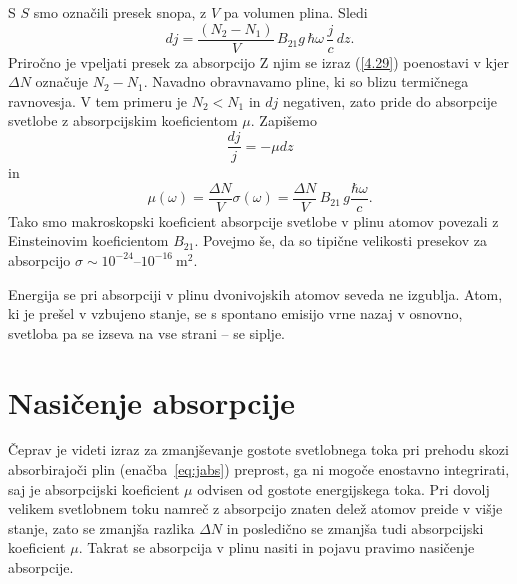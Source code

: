 S $S$ smo označili presek snopa, z $V$ pa volumen plina. Sledi
\begin{equation}
dj=\frac{(N_{2}-N_{1})}{V}\, B_{21}g\, \hbar\omega\,\frac{j}{c}\, dz.
\label{4.29}
\end{equation}
Priročno je vpeljati presek za absorpcijo 
Z njim se izraz (\ref{4.29}) poenostavi v 
kjer $\Delta N$ označuje $N_{2}-N_{1}$.
Navadno obravnavamo pline, ki so blizu termičnega ravnovesja. V tem primeru 
je $N_{2}<N_{1}$ in $dj$ negativen, zato pride do
absorpcije svetlobe z absorpcijskim koeficientom
$\mu$. Zapišemo 
\begin{equation}
\frac{dj}{j} = -\mu dz
\label{eq:jabs}
\end{equation}
in
\begin{equation}
\mu(\omega)=\frac{\Delta N}{V}\sigma(\omega)=
\frac{\Delta N}{V}\, B_{21}\, g\frac{\hbar\omega}{c}.
\label{eq:muabs1}
\end{equation}
Tako smo makroskopski koeficient absorpcije svetlobe v plinu atomov povezali
z Einsteinovim koeficientom $B_{21}$. Povejmo še, da so 
tipične velikosti presekov za absorpcijo $\sigma \sim 10^{-24}$--$10^{-16}~\si{\metre^2}$.

\begin{remark}
Energija se pri absorpciji v plinu dvonivojskih atomov seveda
ne izgublja. Atom, ki je prešel v vzbujeno stanje, se s spontano 
emisijo vrne nazaj v osnovno, svetloba pa se izseva na vse strani -- se siplje. 
\end{remark}

\section{Nasičenje absorpcije}
\label{chap:NasAbs}
Čeprav je videti izraz za zmanjševanje 
gostote svetlobnega toka pri prehodu skozi absorbirajoči plin (enačba~\ref{eq:jabs}) 
preprost, ga ni mogoče enostavno integrirati, saj je absorpcijski koeficient 
$\mu$ odvisen od 
gostote energijskega toka. Pri dovolj velikem svetlobnem toku namreč z 
absorpcijo znaten delež atomov preide v višje stanje, zato se zmanjša razlika $\Delta N$
in posledično se zmanjša tudi absorpcijski koeficient $\mu$. Takrat se absorpcija
v plinu nasiti in pojavu pravimo nasičenje absorpcije.

